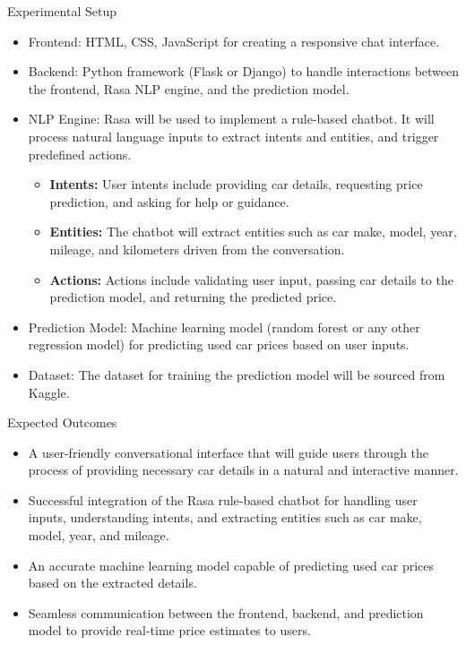 \documentclass{beamer}
\begin{document}
\begin{frame}[t]{Experimental Setup}
    \begin{itemize}
        \item Frontend: HTML, CSS, JavaScript for creating a responsive chat interface.
        \item Backend: Python framework (Flask or Django) to handle interactions between the frontend, Rasa NLP engine, and the prediction model.
        \item NLP Engine: Rasa will be used to implement a rule-based chatbot. It will process natural language inputs to extract intents and entities, and trigger predefined actions.
        \begin{itemize}
            \item \textbf{Intents:} User intents include providing car details, requesting price prediction, and asking for help or guidance.
            \item \textbf{Entities:} The chatbot will extract entities such as car make, model, year, mileage, and kilometers driven from the conversation.
            \item \textbf{Actions:} Actions include validating user input, passing car details to the prediction model, and returning the predicted price.
        \end{itemize}
        \item Prediction Model: Machine learning model (random forest or any other regression model) for predicting used car prices based on user inputs.
        \item Dataset: The dataset for training the prediction model will be sourced from Kaggle.
    \end{itemize}
\end{frame}

\begin{frame}[t]{Expected Outcomes}
    \begin{itemize}
        \item A user-friendly conversational interface that will guide users through the process of providing necessary car details in a natural and interactive manner.
        \item Successful integration of the Rasa rule-based chatbot for handling user inputs, understanding intents, and extracting entities such as car make, model, year, and mileage.
        \item An accurate machine learning model capable of predicting used car prices based on the extracted details.
        \item Seamless communication between the frontend, backend, and prediction model to provide real-time price estimates to users.
    \end{itemize}
\end{frame}
\end{document}

